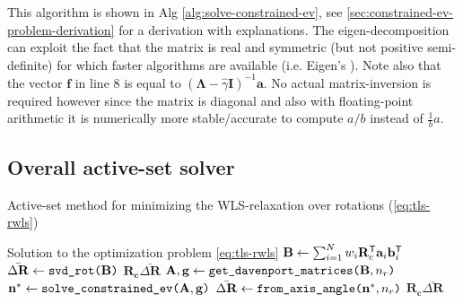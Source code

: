 This algorithm is shown in Alg \ref{alg:solve-constrained-ev}, see \ref{sec:constrained-ev-problem-derivation} for a derivation with explanations.
The eigen-decomposition can exploit the fact that the matrix is real and symmetric (but not positive semi-definite) for which faster algorithms are available (i.e. Eigen's ). Note also that the vector $\mathbf{f}$ in line 8 is equal to $(\mathbf{\Lambda} - \hat{\gamma} \mathbf{I})^{-1} \mathbf{a}$. No actual matrix-inversion is required however since the matrix is diagonal and also with floating-point arithmetic it is numerically more stable/accurate to compute $a/b$ instead of $\frac{1}{b} a$. 


\subsection{Overall active-set solver}

\begin{algorithm}[!ht]
	\caption{Active-set method for minimizing the WLS-relaxation over rotations (\ref{eq:tls-rwls})}
	\label{alg:min-wls-relax-rot}
	\begin{algorithmic}[1]
		\Ensure Solution to the optimization problem \ref{eq:tls-rwls}
		\hypertarget{ref:min-wls-relax-rot2}{
			}
		\State $\mathbf{B} \leftarrow \sum_{i=1}^N w_i \mathbf{R}_c^{\mathsf{T}} \mathbf{a}_i\mathbf{b}_i^{\mathsf{T}} $ 
		\State $\bar{\Delta \mathbf{R}} \leftarrow \texttt{svd\_rot(} \mathbf{B} \texttt{)}$  
		 
		\State \Return $\mathbf{R_c} \bar{\Delta \mathbf{R}}$
		\EndIf
		\State $\mathbf{A}, \mathbf{g} \leftarrow \texttt{get\_davenport\_matrices(} \mathbf{B}, n_r \texttt{)}$ 
		\State $\mathbf{n}^* \leftarrow \texttt{solve\_constrained\_ev(} \mathbf{A}, \mathbf{g} \texttt{)}$ 
		\State $\bar{\Delta \mathbf{R}} \leftarrow \texttt{from\_axis\_angle(}\mathbf{n}^*, n_r \texttt{)}$ 
		\State \Return $\mathbf{R_c} \bar{\Delta \mathbf{R}}$
		\EndFunction
	\end{algorithmic}
\end{algorithm}


